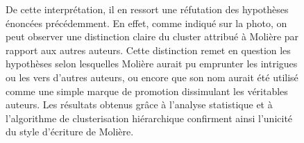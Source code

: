 \begin{figure}[htbp]
    De cette interprétation, il en ressort une réfutation des hypothèses énoncées
précédemment. En effet, comme indiqué sur la photo, on peut observer une
distinction claire du cluster attribué à Molière par rapport aux autres auteurs.
Cette distinction remet en question les hypothèses selon lesquelles Molière
aurait pu emprunter les intrigues ou les vers d'autres auteurs, ou encore que
son nom aurait été utilisé comme une simple marque de promotion dissimulant les
véritables auteurs. Les résultats obtenus grâce à l'analyse statistique et à
l'algorithme de clusterisation hiérarchique confirment ainsi l'unicité du style
d'écriture de Molière.
\end{figure}